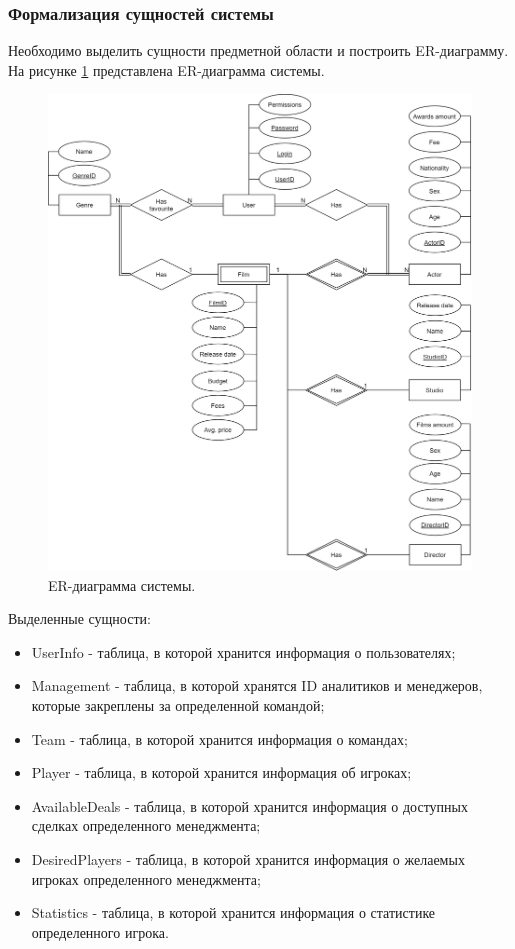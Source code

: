 \subsubsection{Формализация сущностей системы}
Необходимо выделить сущности предметной области и построить ER-диаграмму. 
На рисунке \ref{img:ER} представлена ER-диаграмма системы.
\begin{figure}[h!]
	\centering
	\includegraphics[scale=0.18]{img/ER.png}
	\caption{ER-диаграмма системы.}
	\label{img:ER}
\end{figure}
\newpage
Выделенные сущности:
\begin{itemize}
	\item[1)] UserInfo - таблица, в которой хранится информация о пользователях;
	\item[2)] Management - таблица, в которой хранятся ID аналитиков и менеджеров, которые закреплены за определенной командой;
	\item[3)] Team - таблица, в которой хранится информация о командах;
	\item[4)] Player - таблица, в которой хранится информация об игроках;
	\item[5)] AvailableDeals - таблица, в которой хранится информация о доступных сделках определенного менеджмента;
	\item[6)] DesiredPlayers - таблица, в которой хранится информация о желаемых игроках определенного менеджмента;
	\item[7)] Statistics - таблица, в которой хранится информация о статистике определенного игрока.
\end{itemize}

